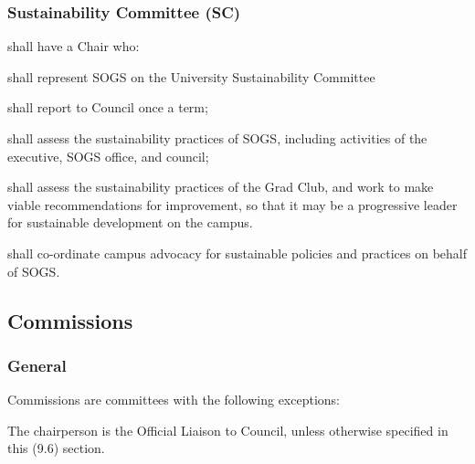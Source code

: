 \subsubsection{Sustainability Committee (SC)}
\begin{longenum}[ label*=\thesubsubsection.\arabic*., align=left]
    \item shall have a Chair who:
    \begin{longenum}[ label*=\arabic*., align=left]
		\item shall represent SOGS on the University Sustainability Committee
        \item shall report to Council once a term;
	\end{longenum}
    \item shall assess the sustainability practices of SOGS, including activities of the executive, SOGS office, and council;
    \item shall assess the sustainability practices of the Grad Club, and work to make viable recommendations for improvement, so that it  may be a progressive leader for sustainable development  on the campus. 
    \item shall co-ordinate campus advocacy for sustainable policies and practices on behalf of SOGS.
\end{longenum}


\subsection{Commissions}
\subsubsection{General}
\begin{longenum}[ label*=\thesubsubsection.\arabic*., align=left]
	\item Commissions are committees with the following exceptions:
    \begin{longenum}[ label*=\arabic*., align=left]
		\item The chairperson is the Official Liaison to Council, unless otherwise specified in this (9.6) section.
	\end{longenum}
\end{longenum}
